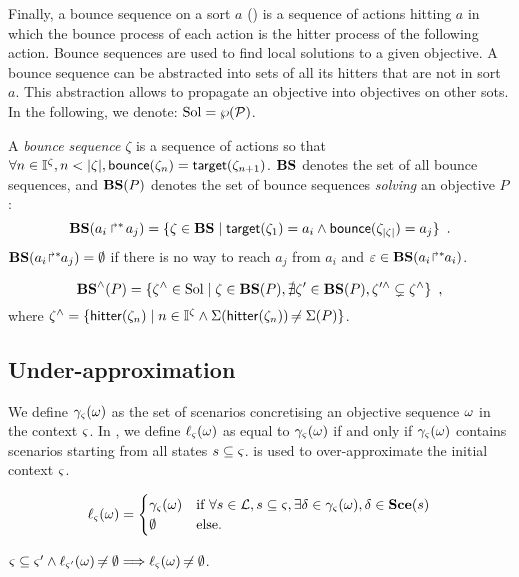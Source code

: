 Finally, a bounce sequence on a sort $a$ () is a sequence of actions hitting $a$
in which the bounce process of each action is the hitter process of the following action.
Bounce sequences are used to find local solutions to a given objective.
A bounce sequence can be abstracted into sets of all its hitters that are not in sort $a$.
This abstraction allows to propagate an objective into objectives on other sots.
In the following, we denote: $\mathrm{Sol} = \wp(\mathcal{P})$.
\begin{definition}
\label{def:bs}
  A \emph{bounce sequence} $\zeta$ is a sequence of actions so that $\forall n \in \mathbb{I}^{\zeta}, n < |\zeta|, \mathsf{bounce}(\zeta_{n}) = \mathsf{target}(\zeta_{n+1})$.
  $\mathbf{BS}$ denotes the set of all bounce sequences, and
  $\mathbf{BS}(P)$ denotes the set of bounce sequences \emph{solving} an objective $P$:
  \[
    \mathbf{BS}(\mbox{$a_i\Rsh^*\!a_j$}) = \{ \zeta \in \mathbf{BS} \mid \mathsf{target}(\zeta_1)= a_i \wedge \mathsf{bounce}(\zeta_{|\zeta|}) = a_j \} \enspace.
  \]
  $\mathbf{BS}({a_i\!\Rsh^*\!\!a_j}) = \emptyset$ if there is no way to reach $a_j$ from $a_i$ and $\varepsilon \in \mathbf{BS}({a_i\!\Rsh^*\!\!a_i})$.
\end{definition}
%
\begin{definition}[$\aBS:\Obj \rightarrow \powerset(\Sol)$]
\label{def:aBS}
  \[
    \mathbf{BS}^\wedge(P) = \{ \zeta^\wedge \in \mathrm{Sol} \mid \zeta \in \mathbf{BS}(P), \nexists \zeta' \in \mathbf{BS}(P), \zeta'^\wedge \subsetneq \zeta^\wedge \} \enspace,
  \]
  where $\zeta^\wedge = \{ \mathsf{hitter}(\zeta_n) \mid  n \in \mathbb{I}^{\zeta} \wedge \Sigma(\mathsf{hitter}(\zeta_n)) \not\nobreak\mkern -2mu = \Sigma(P) \}$.
\end{definition}



\subsection{Under-approximation}

We define $\gamma_\varsigma(\omega)$ as the set of scenarios concretising an objective sequence $\omega$ in the context $\varsigma$.
In , we define $\ell_\varsigma(\omega)$ as equal to $\gamma_\varsigma(\omega)$ if and only if $\gamma_\varsigma(\omega)$ contains scenarios starting from all states $s \subseteq \varsigma$.
 is used to over-approximate the initial context $\varsigma$.
\begin{definition}[$\uconcr: \OS \rightarrow \powerset(\Sce)$]
\label{def:uconcr}
  \[
  \ell_\varsigma(\omega) = 
  \begin{cases}
    \gamma_\varsigma(\omega) & \text{if } \forall s \in \mathcal{L}, s \subseteq \varsigma, \exists \delta \in \gamma_\varsigma(\omega), \delta \in \mathbf{Sce}(s) \\
    \emptyset & \text{else.}
  \end{cases}
  \]
\end{definition}
% 
\begin{theorem}
\label{th:uconcr-ctx}
  $\varsigma \subseteq \varsigma' \wedge \ell_{\varsigma'}(\omega) \not\nobreak\mkern -2mu = \emptyset \Longrightarrow \ell_{\varsigma}(\omega) \not\nobreak\mkern -2mu = \emptyset$.
\end{theorem}

